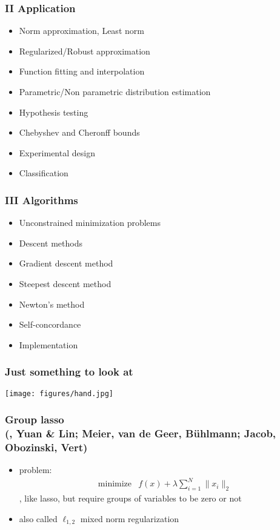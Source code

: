 \documentclass[10pt,mathserif]{beamer}
\begin{document}
\begin{frame}\frametitle{ II Application}
	
	\begin{block}{}
		\begin{itemize}
			\item Norm approximation, Least norm
			\item Regularized/Robust approximation 
			\item Function fitting and interpolation
			\item Parametric/Non parametric distribution estimation
			\item Hypothesis testing 
			\item Chebyshev and Cheronff bounds
			\item Experimental design
			\item Classification
		\end{itemize}
	\end{block}
\end{frame}

\begin{frame}\frametitle{ III Algorithms}
	
	\begin{block}{}
		\begin{itemize}
			\item  Unconstrained minimization problems 
			\item Descent methods
	 		\item Gradient descent method
			\item Steepest descent method
			\item Newton’s method
			\item Self-concordance
			\item Implementation
		
		\end{itemize}
	\end{block}
\end{frame}

\begin{frame}\frametitle{Just something to look at}
\begin{center}
\texttt{[image: figures/hand.jpg]}
\end{center}
\end{frame}

\begin{frame}
\frametitle{Group lasso \\[-0.3em] 
{\footnotesize \textmd{(\eg, Yuan \& Lin; Meier, van de Geer, B\"uhlmann; Jacob, Obozinski, Vert)}}}
\begin{itemize}\itemsep=12pt
\item problem:
\[
\begin{array}{ll}
\mbox{minimize} & f(x) + \lambda \sum_{i=1}^N \|x_i\|_2
\end{array}
\]
\ie, like lasso, but require groups of variables to be zero or not
\item also called $\ell_{1,2}$ mixed norm regularization
\end{itemize}
\end{frame}
\end{document}
